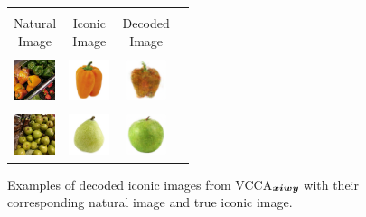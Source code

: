 
\begin{figure}
	\centering
	\vspace{-5mm}
	\begin{tabular}{c c c c}
		\hline \\[-5mm]
		\thead{\scriptsize Natural \\[-2mm] \scriptsize Image} & \thead{\scriptsize Iconic \\[-2mm] \scriptsize Image} & \thead{\scriptsize Decoded \\[-2mm] \scriptsize Image} \\[-1mm]
		\hline \\[-3mm]
		\includegraphics[width=12mm, height=12mm]{Chapter3/figures/decoded_iconic_images/Orange-Bell-Pepper_008.jpg} & \includegraphics[width=12mm, height=12mm]{Chapter3/figures/iconic_image_figures/Orange-Bell-Pepper_Iconic.jpg} & \includegraphics[width=12mm, height=12mm]{Chapter3/figures/decoded_iconic_images/vcca_xiwy/orange_bell_pepper_image2191.png}  \\[-0.7mm] 
		\hline \\[-3mm]
		\includegraphics[width=12mm, height=12mm]{Chapter3/figures/decoded_iconic_images/Anjou_015.jpg} & \includegraphics[width=12mm, height=12mm]{Chapter3/figures/iconic_image_figures/Anjou-Pear_Clean.jpg} & \includegraphics[width=12mm, height=12mm]{Chapter3/figures/decoded_iconic_images/vcca_xiwy/anjou_pear_image849.png} \\[-0.7mm]
		\hline
	\end{tabular}
	\vspace{-3mm}
	\caption{Examples of decoded iconic images from VCCA$_{{\bm{x}} {\bm{i}} {\bm{w}} {\bm{y}}}$ with their corresponding natural image and true iconic image.}
	\vspace{-2mm}
	\label{fig:decoded_iconic_images}
\end{figure} 
